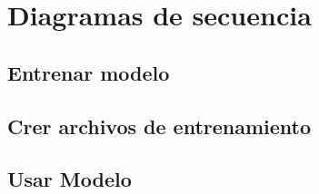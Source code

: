 \chapter{Diagramas de secuencia}

\section{Entrenar modelo}



\newpage
\section{Crer archivos de entrenamiento}



\newpage
\section{Usar Modelo}

